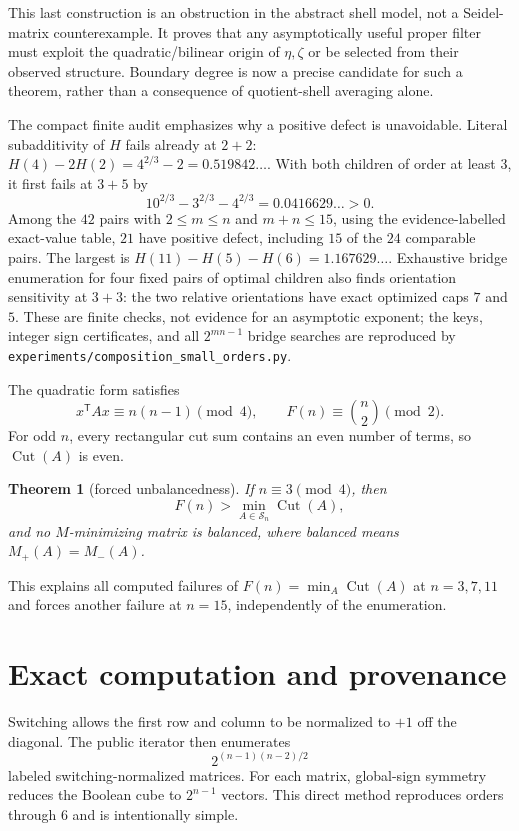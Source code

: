 \documentclass[11pt]{article}
\newtheorem{theorem}{Theorem}[section]
\theoremstyle{definition}
\theoremstyle{remark}
\newcommand{\Sn}{\mathcal S_n}
\newcommand{\Cut}{\operatorname{Cut}}
\begin{document}
This last construction is an obstruction in the abstract shell model, not a
Seidel-matrix counterexample.  It proves that any asymptotically useful
proper filter must exploit the quadratic/bilinear origin of $\eta,\zeta$ or
be selected from their observed structure.  Boundary degree is now a precise
candidate for such a theorem, rather than a consequence of quotient-shell
averaging alone.

The compact finite audit emphasizes why a positive defect is unavoidable.
Literal subadditivity of $H$ fails already at $2+2$:
$H(4)-2H(2)=4^{2/3}-2=0.519842\ldots$.  With both children of order at
least $3$, it first fails at $3+5$ by
\[
 10^{2/3}-3^{2/3}-4^{2/3}=0.0416629\ldots>0.
\]
Among the $42$ pairs with $2\le m\le n$ and $m+n\le15$, using the
evidence-labelled exact-value table, $21$ have positive defect, including
$15$ of the $24$ comparable pairs.  The largest is
$H(11)-H(5)-H(6)=1.167629\ldots$.  Exhaustive bridge enumeration for four
fixed pairs of optimal children also finds orientation sensitivity at
$3+3$: the two relative orientations have exact optimized caps $7$ and $5$.
These are finite checks, not evidence for an asymptotic exponent; the keys,
integer sign certificates, and all $2^{mn-1}$ bridge searches are reproduced
by \texttt{experiments/composition\_small\_orders.py}.

The quadratic form satisfies
\[
 x^{\mathsf T}Ax\equiv n(n-1)\pmod4,
 \qquad
 F(n)\equiv\binom n2\pmod2.
\]
For odd $n$, every rectangular cut sum contains an even number of terms, so
$\Cut(A)$ is even.

\begin{theorem}[forced unbalancedness]
If $n\equiv3\pmod4$, then
\[
 F(n)>\min_{A\in\Sn}\Cut(A),
\]
and no $M$-minimizing matrix is balanced, where balanced means
$M_+(A)=M_-(A)$.
\end{theorem}

This explains all computed failures of $F(n)=\min_A\Cut(A)$ at
$n=3,7,11$ and forces another failure at $n=15$, independently of the
enumeration.

\section{Exact computation and provenance}\label{sec:computation}

Switching allows the first row and column to be normalized to $+1$ off the
diagonal.  The public iterator then enumerates
\[
 2^{(n-1)(n-2)/2}
\]
labeled switching-normalized matrices.  For each matrix, global-sign symmetry
reduces the Boolean cube to $2^{n-1}$ vectors.  This direct method reproduces
orders through $6$ and is intentionally simple.
\end{document}
